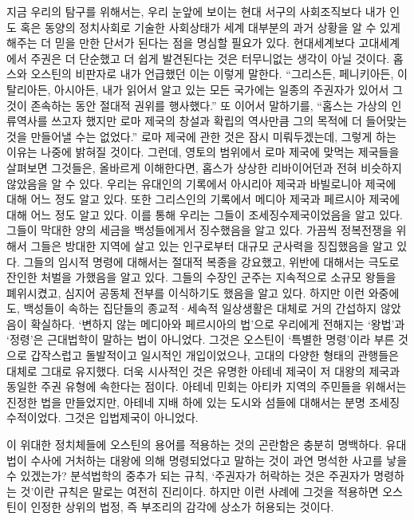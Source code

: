 지금 우리의 탐구를 위해서는,
우리 눈앞에 보이는 현대 서구의 사회조직보다
내가 인도 혹은 동양의 정치사회로 기술한 사회상태가
세계 대부분의 과거 상황을 알 수 있게 해주는 더 믿을 만한 단서가 된다는 점을
명심할 필요가 있다.
현대세계보다 고대세계에서 주권은 더 단순했고 더 쉽게 발견된다는 것은
터무니없는 생각이 아닐 것이다.
홉스와 오스틴의 비판자로 내가 언급했던 이는 이렇게 말한다.
``그리스든, 페니키아든, 이탈리아든, 아시아든,
내가 읽어서 알고 있는 모든 국가에는
일종의 주권자가 있어서 그것이 존속하는 동안 절대적 권위를 행사했다.''
또 이어서 말하기를,
``홉스는 가상의 인류역사를 쓰고자 했지만
로마 제국의 창설과 확립의 역사만큼 그의 목적에 더 들어맞는 것을
만들어낼 수는 없었다.''
로마 제국에 관한 것은 잠시 미뤄두겠는데,
그렇게 하는 이유는 나중에 밝혀질 것이다.
그런데,
영토의 범위에서 로마 제국에 맞먹는 제국들을 살펴보면
그것들은, 올바르게 이해한다면,
홉스가 상상한 리바이어던과 전혀 비슷하지 않았음을
알 수 있다.
우리는 유대인의 기록에서 아시리아 제국과 바빌로니아 제국에 대해
어느 정도 알고 있다.
또한 그리스인의 기록에서 메디아 제국과 페르시아 제국에 대해
어느 정도 알고 있다.
이를 통해 우리는 그들이 조세징수제국이었음을 알고 있다.
그들이 막대한 양의 세금을 백성들에게서 징수했음을 알고 있다.
가끔씩 정복전쟁을 위해서 그들은 방대한 지역에 살고 있는 인구로부터
대규모 군사력을 징집했음을 알고 있다.
그들의 임시적 명령에 대해서는 절대적 복종을 강요했고, 위반에 대해서는
극도로 잔인한 처벌을 가했음을 알고 있다.
그들의 수장인 군주는 지속적으로 소규모 왕들을 폐위시켰고,
심지어 공동체 전부를 이식하기도 했음을 알고 있다.
하지만 이런 와중에도,
백성들이 속하는 집단들의 종교적·세속적 일상생활은
대체로 거의 간섭하지 않았음이 확실하다.
`변하지 않는 메디아와 페르시아의 법'으로
우리에게 전해지는 `왕법'과 `정령'은
근대법학이 말하는 법이 아니었다.
그것은 오스틴이 `특별한 명령'이라 부른 것으로
갑작스럽고 돌발적이고 일시적인 개입이었으나,
고대의 다양한 형태의 관행들은 대체로 그대로 유지했다.
더욱 시사적인 것은
유명한 아테네 제국이
저 대왕의 제국과 동일한 주권 유형에 속한다는 점이다.
아테네 민회는 아티카 지역의 주민들을 위해서는 진정한 법을 만들었지만,
아테네 지배 하에 있는 도시와 섬들에 대해서는 분명
조세징수적이었다.
그것은 입법제국이 아니었다.

이 위대한 정치체들에 오스틴의 용어를 적용하는 것의 곤란함은 충분히 명백하다.
유대법이 수사에 거처하는 대왕에 의해 명령되었다고 말하는 것이
과연 명석한 사고를 낳을 수 있겠는가?
분석법학의 중추가 되는 규칙, `주권자가 허락하는 것은 주권자가 명령하는 것'이란
규칙은 말로는 여전히 진리이다.
하지만 이런 사례에 그것을 적용하면
오스틴이 인정한 상위의 법정, 즉 부조리의 감각에 상소가 허용되는 것이다.

